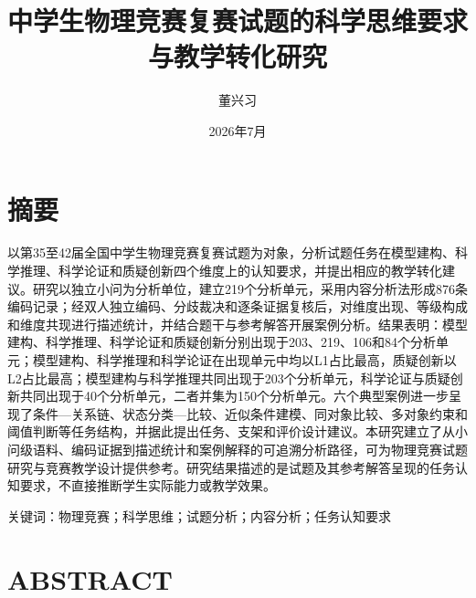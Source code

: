 \documentclass[
  12pt,
  a4paper]{ctexbook}
\title{中学生物理竞赛复赛试题的科学思维要求与教学转化研究}
\author{董兴习}
\date{2026年7月}
\begin{document}
\frontmatter
\maketitle

{
\setcounter{tocdepth}{2}
\tableofcontents
}
\mainmatter
\chapter*{摘要}\label{ux6458ux8981}

以第35至42届全国中学生物理竞赛复赛试题为对象，分析试题任务在模型建构、科学推理、科学论证和质疑创新四个维度上的认知要求，并提出相应的教学转化建议。研究以独立小问为分析单位，建立219个分析单元，采用内容分析法形成876条编码记录；经双人独立编码、分歧裁决和逐条证据复核后，对维度出现、等级构成和维度共现进行描述统计，并结合题干与参考解答开展案例分析。结果表明：模型建构、科学推理、科学论证和质疑创新分别出现于203、219、106和84个分析单元；模型建构、科学推理和科学论证在出现单元中均以L1占比最高，质疑创新以L2占比最高；模型建构与科学推理共同出现于203个分析单元，科学论证与质疑创新共同出现于40个分析单元，二者并集为150个分析单元。六个典型案例进一步呈现了条件---关系链、状态分类---比较、近似条件建模、同对象比较、多对象约束和阈值判断等任务结构，并据此提出任务、支架和评价设计建议。本研究建立了从小问级语料、编码证据到描述统计和案例解释的可追溯分析路径，可为物理竞赛试题研究与竞赛教学设计提供参考。研究结果描述的是试题及其参考解答呈现的任务认知要求，不直接推断学生实际能力或教学效果。

关键词：物理竞赛；科学思维；试题分析；内容分析；任务认知要求

\chapter*{ABSTRACT}\label{abstract}
\end{document}
